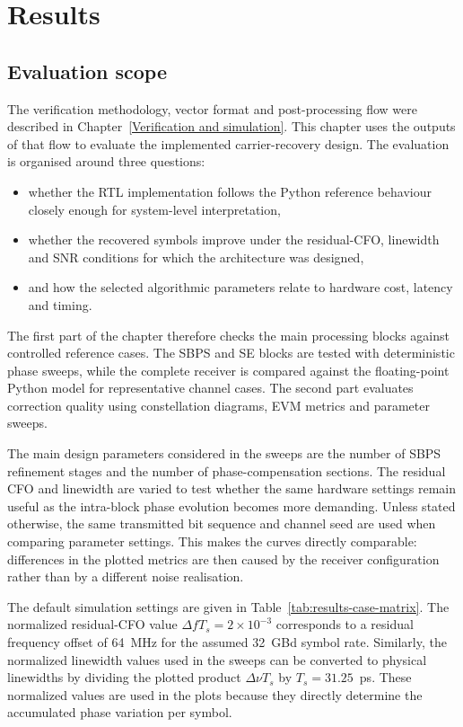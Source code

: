 \chapter{Results}\label{Results}

\section{Evaluation scope}

The verification methodology, vector format and post-processing flow were described in Chapter~\ref{Verification and simulation}. This chapter uses the outputs of that flow to evaluate the implemented carrier-recovery design. The evaluation is organised around three questions:
\begin{itemize}
    \item whether the \ac{RTL} implementation follows the Python reference behaviour closely enough for system-level interpretation,
    \item whether the recovered symbols improve under the residual-\ac{CFO}, linewidth and \ac{SNR} conditions for which the architecture was designed,
    \item and how the selected algorithmic parameters relate to hardware cost, latency and timing.
\end{itemize}

The first part of the chapter therefore checks the main processing blocks against controlled reference cases. The \ac{SBPS} and \ac{SE} blocks are tested with deterministic phase sweeps, while the complete receiver is compared against the floating-point Python model for representative channel cases. The second part evaluates correction quality using constellation diagrams, \ac{EVM} metrics and parameter sweeps.

The main design parameters considered in the sweeps are the number of \ac{SBPS} refinement stages and the number of phase-compensation sections. The residual \ac{CFO} and linewidth are varied to test whether the same hardware settings remain useful as the intra-block phase evolution becomes more demanding. Unless stated otherwise, the same transmitted bit sequence and channel seed are used when comparing parameter settings. This makes the curves directly comparable: differences in the plotted metrics are then caused by the receiver configuration rather than by a different noise realisation.

The default simulation settings are given in Table~\ref{tab:results-case-matrix}. The normalized residual-\ac{CFO} value $\Delta f T_s = 2\times10^{-3}$ corresponds to a residual frequency offset of 64~MHz for the assumed 32~GBd symbol rate. Similarly, the normalized linewidth values used in the sweeps can be converted to physical linewidths by dividing the plotted product $\Delta\nu T_s$ by $T_s = 31.25$~ps. These normalized values are used in the plots because they directly determine the accumulated phase variation per symbol.


